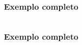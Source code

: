 \documentclass{beamer}
\begin{document}
\begin{frame}
	\frametitle{Exemplo completo}
	\begin{columns}[T] %
		\begin{column}{.5\textwidth}
		
			\end{column}%
		\hfill%
		\begin{column}{.5\textwidth}
				
		\end{column}%
	\end{columns}
\end{frame}

\begin{frame}
	\frametitle{Exemplo completo}
	\begin{columns}[T] %
		\begin{column}{.5\textwidth}
		
			\end{column}%
		\hfill%
		\begin{column}{.5\textwidth}
				
		\end{column}%
	\end{columns}
\end{frame}
\end{document}
